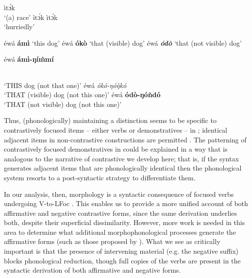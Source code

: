 \documentclass[output=paper,
modfonts
]{langscibook}
\begin{document}
\ea\label{ex:duncan:20}
  \ea 
  ìt\'{ɔ}k\\
  \glt ‘(a) race’
  \ex
    ìt\'{ɔ}k ìt\'{ɔ}k\\
  \glt ‘hurriedly’
  \z
\z

\begin{multicols}{2}
\ea\label{ex:duncan:21}
  \begin{xlista}
  \ex\label{ex:duncan:21a}
  {{éwá }\textbf{{ámì}}    
  \glt ‘this dog’          
  \ex\label{ex:duncan:21b}
  {éwá }\textbf{{ókò}}       
  \glt ‘that (visible) dog’  
  \ex\label{ex:duncan:21c}
  {éwá }\textbf{\textit{ódò}}   
  \glt ‘that (not visible) dog’
  \vspace*{\baselineskip}
  
  {éwá }\textbf{{ámì-ŋí\`{m}mí}}}\\
  \glt ‘THIS dog (not that one)’
  {éwá }{\textit{ókó-ŋó\`{ŋ}kó}}\\
  ‘THAT (visible) dog (not this one)’
   {éwá }\textbf{{ódò-ŋóǹdó}}\\
  \glt ‘THAT (not visible) dog (not this one)’
  \end{xlista}
\z
\end{multicols}

\newpage 
Thus, (phonologically) maintaining a distinction seems to be specific to contrastively focused items – either verbs or demonstratives – in ; identical adjacent items in non-contrastive constructions are permitted . The patterning of contrastively focused demonstratives in  could be explained in a way that is analogous to the narrative of contrastive   we develop here; that is, if the syntax generates adjacent items that are phonologically identical then the phonological system resorts to a post-syntactic strategy to differentiate them.

In our analysis, then,   morphology is a syntactic consequence of focused verbs undergoing V-to-LFoc . This enables us to provide a more unified account of both affirmative and negative contrastive  forms, since the same derivation underlies both, despite their superficial dissimilarity. However, more work is needed in this area to determine what additional morphophonological processes generate the affirmative forms (such as those proposed by \citealt{AkinlabiUrua2000,AkinlabiUrua2002}). What we see as critically important is that the presence of intervening material (e.g. the negative suffix) blocks phonological reduction, though full copies of the verbs are present in the syntactic derivation of both affirmative and negative forms.
\end{document}
